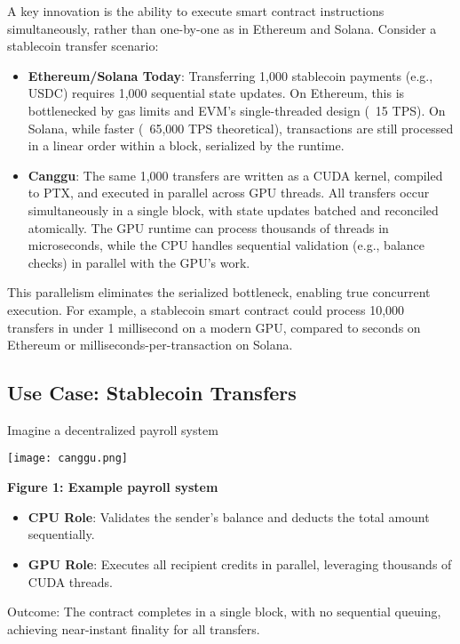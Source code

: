 \documentclass[12pt]{article}
\begin{document}
\begin{justify}
    
A key innovation is the ability to execute smart contract instructions simultaneously, rather than one-by-one as in Ethereum and Solana. Consider a stablecoin transfer scenario:
\begin{itemize}
    \item \textbf{Ethereum/Solana Today}: Transferring 1,000 stablecoin payments (e.g., USDC) requires 1,000 sequential state updates. On Ethereum, this is bottlenecked by gas limits and EVM’s single-threaded design (~15 TPS). On Solana, while faster (~65,000 TPS theoretical), transactions are still processed in a linear order within a block, serialized by the runtime.
    
    \item \textbf{Canggu}: The same 1,000 transfers are written as a CUDA kernel, compiled to PTX, and executed in parallel across GPU threads. All transfers occur simultaneously in a single block, with state updates batched and reconciled atomically. The GPU runtime can process thousands of threads in microseconds, while the CPU handles sequential validation (e.g., balance checks) in parallel with the GPU’s work.
\end{itemize}

This parallelism eliminates the serialized bottleneck, enabling true concurrent execution. For example, a stablecoin smart contract could process 10,000 transfers in under 1 millisecond on a modern GPU, compared to seconds on Ethereum or milliseconds-per-transaction on Solana.

\end{justify}

\subsection{Use Case: Stablecoin Transfers}
\begin{justify}
Imagine a decentralized payroll system

\vspace{1cm}
\noindent\centering
\texttt{[image: canggu.png]}

\noindent
\textbf{Figure 1: Example payroll system}

\begin{itemize}
    \item \textbf{CPU Role}: Validates the sender’s balance and deducts the total amount sequentially.
    \item \textbf{GPU Role}: Executes all recipient credits in parallel, leveraging thousands of CUDA threads.

\end{itemize}
Outcome: The contract completes in a single block, with no sequential queuing, achieving near-instant finality for all transfers.
\end{justify}
\end{document}
